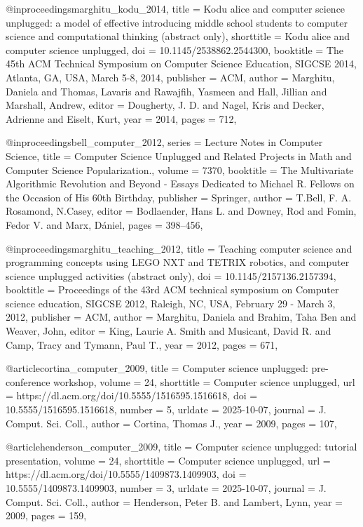 @inproceedings{marghitu_kodu_2014,
	title = {Kodu alice and computer science unplugged: a model of effective introducing middle school students to computer 
science and computational thinking (abstract only)},
	shorttitle = {Kodu alice and computer science unplugged},
	doi = {10.1145/2538862.2544300},
	booktitle = {The 45th {ACM} {Technical} {Symposium} on {Computer} {Science} {Education}, {SIGCSE} 2014, {Atlanta}, {GA}, 
{USA}, {March} 5-8, 2014},
	publisher = {ACM},
	author = {Marghitu, Daniela and Thomas, Lavaris and Rawajfih, Yasmeen and Hall, Jillian and Marshall, Andrew},
	editor = {Dougherty, J. D. and Nagel, Kris and Decker, Adrienne and Eiselt, Kurt},
	year = {2014},
	pages = {712},
}

@inproceedings{bell_computer_2012,
	series = {Lecture Notes in Computer Science},
	title = {Computer Science Unplugged and {Related} Projects in Math and Computer Science Popularization.},
	volume = {7370},
	booktitle = {The Multivariate Algorithmic Revolution and Beyond - Essays Dedicated to Michael R. Fellows on the Occasion 
of His 60th Birthday},
	publisher = {Springer},
	author = {T.Bell, F. A. Rosamond, N.Casey},
	editor = {Bodlaender, Hans L. and Downey, Rod and Fomin, Fedor V. and Marx, Dániel},
	pages = {398--456},
}

@inproceedings{marghitu_teaching_2012,
	title = {Teaching computer science and programming concepts using {LEGO} {NXT} and {TETRIX} robotics, and computer 
science unplugged activities (abstract only)},
	doi = {10.1145/2157136.2157394},
	booktitle = {Proceedings of the 43rd {ACM} technical symposium on {Computer} science education, {SIGCSE} 2012, 
{Raleigh}, {NC}, {USA}, {February} 29 - {March} 3, 2012},
	publisher = {ACM},
	author = {Marghitu, Daniela and Brahim, Taha Ben and Weaver, John},
	editor = {King, Laurie A. Smith and Musicant, David R. and Camp, Tracy and Tymann, Paul T.},
	year = {2012},
	pages = {671},
}

@article{cortina_computer_2009,
	title = {Computer science unplugged: pre-conference workshop},
	volume = {24},
	shorttitle = {Computer science unplugged},
	url = {https://dl.acm.org/doi/10.5555/1516595.1516618},
	doi = {10.5555/1516595.1516618},
	number = {5},
	urldate = {2025-10-07},
	journal = {J. Comput. Sci. Coll.},
	author = {Cortina, Thomas J.},
	year = {2009},
	pages = {107},
}

@article{henderson_computer_2009,
	title = {Computer science unplugged: tutorial presentation},
	volume = {24},
	shorttitle = {Computer science unplugged},
	url = {https://dl.acm.org/doi/10.5555/1409873.1409903},
	doi = {10.5555/1409873.1409903},
	number = {3},
	urldate = {2025-10-07},
	journal = {J. Comput. Sci. Coll.},
	author = {Henderson, Peter B. and Lambert, Lynn},
	year = {2009},
	pages = {159},
}

